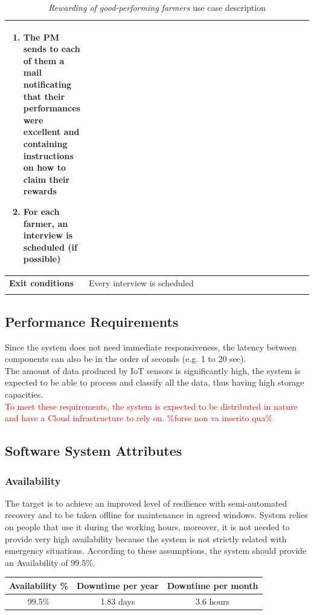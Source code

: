 \documentclass[10pt]{article}
\begin{document}
\begin{enumerate}
\begin{longtable}{p{0.26\linewidth}p{0.75\linewidth}}
\begin{enumerate}
                \item The PM sends to each of them a mail notificating that their performances were excellent and containing instructions on how to claim their rewards
                \item For each farmer, an interview is scheduled (if possible)
            \end{enumerate} \\
            \midrule
            \textbf{Exit conditions} & Every interview is scheduled\\
            \midrule
            \bottomrule
            \caption{\emph{Rewarding of good-performing farmers} use case description}
        \end{longtable}
    \newpage
\end{enumerate}
\subsection{Performance Requirements}
Since the system does not need immediate responsiveness, the latency between components can also be in the order of seconds (e.g. 1 to 20 sec).\\
The amount of data produced by IoT sensors is significantly high, the system is expected to be able to process and classify all the data, thus having high storage capacities.\\
\textcolor{red}{To meet these requirements, the system is expected to be distributed in nature and have a Cloud infrastructure to rely on. \%forse non va inserito qua\%}
\subsection{Software System Attributes}
\subsubsection{Availability}
The target is to achieve an improved level of resilience with semi-automated recovery and to be taken offline for maintenance in agreed windows.
System relies on people that use it during the working hours, moreover, it is not needed to provide very high availability because the system is not strictly related with emergency situations.
According to these assumptions, the system should provide an Availability of 99.5\%.
\begin{center}
    \begin{tabular}{|c c c|} 
    \hline
    Availability \% & Downtime per year & Downtime per month\\ 
    \hline
    99.5\%  & 1.83 days & 3.6 hours\\ 
    \hline
    \end{tabular}
\end{center}
\end{document}
